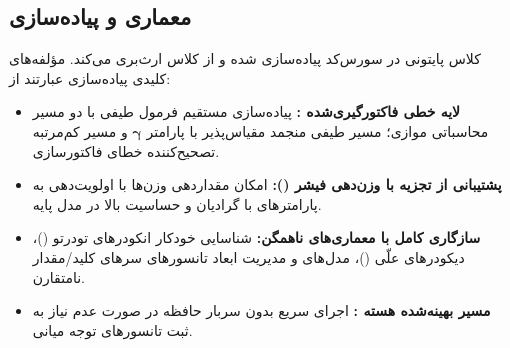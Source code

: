 \subsection{معماری و پیاده‌سازی}
کلاس پایتونی  در سورس‌کد  پیاده‌سازی شده و از کلاس  ارث‌بری می‌کند. مؤلفه‌های کلیدی پیاده‌سازی عبارتند از:
\begin{itemize}
    \item \textbf{لایه خطی فاکتورگیری‌شده :} پیاده‌سازی مستقیم فرمول طیفی با دو مسیر محاسباتی موازی؛ مسیر طیفی منجمد مقیاس‌پذیر با پارامتر $\boldsymbol{\gamma}$ و مسیر کم‌مرتبه تصحیح‌کننده خطای فاکتورسازی.
    \item \textbf{پشتیبانی از تجزیه با وزن‌دهی فیشر ():} امکان مقداردهی وزن‌ها با اولویت‌دهی به پارامترهای با گرادیان و حساسیت بالا در مدل پایه.
    \item \textbf{سازگاری کامل با معماری‌های ناهمگن:} شناسایی خودکار انکودرهای تودرتو ()، دیکودرهای علّی ()، مدل‌های  و مدیریت ابعاد تانسورهای سرهای کلید/مقدار نامتقارن.
    \item \textbf{مسیر بهینه‌شده هسته :} اجرای سریع بدون سربار حافظه در صورت عدم نیاز به ثبت تانسورهای توجه میانی.
\end{itemize}
